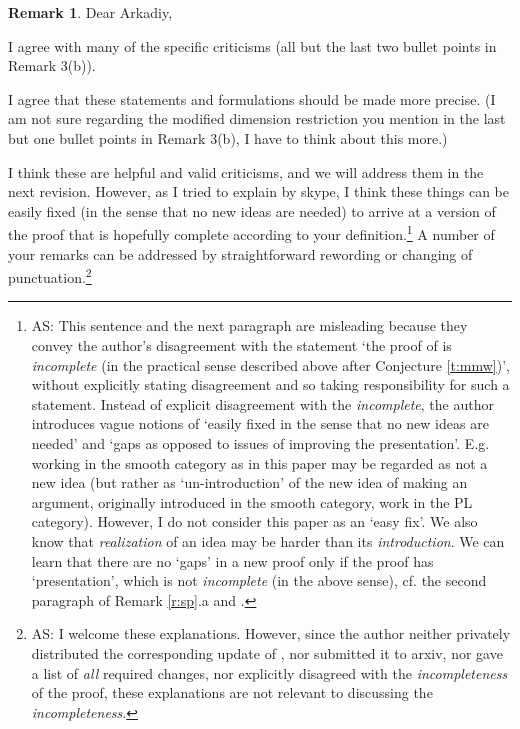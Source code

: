 \documentclass[12pt]{article}
\theoremstyle{plain}
\theoremstyle{definition}
\newtheorem{Remark}[Theorem]{Remark}
\begin{document}
{\begin{Remark}
Dear Arkadiy,

I agree with many of the specific criticisms (all but the last two bullet points in Remark 3(b)).

I agree that these statements and formulations should be made more precise.
(I am not sure regarding the modified dimension restriction you mention in the last
but one bullet points in Remark 3(b), I have to think about this more.)

I think these are helpful and valid criticisms, and we will address them in the next revision.
However, as I tried to explain by skype, I think these things can be easily fixed (in the sense that
no new ideas are needed)  to arrive at a version of the proof that is hopefully
complete according to your definition.\footnote{\label{f:unc} AS: This sentence and the next paragraph are misleading because they convey the author's disagreement with the statement `the proof of \cite{MW16} is {\it incomplete} (in the practical sense described above after Conjecture \ref{t:mmw})',  without explicitly stating disagreement  and so taking responsibility for such a statement.
Instead of explicit disagreement with the {\it incomplete}, the author introduces vague notions of `easily fixed in the sense that no new ideas are needed' and `gaps as opposed to issues of improving the presentation'.
\newline
E.g. working in the smooth category as in
this paper may be regarded as not a new idea (but rather as
`un-introduction' of the new idea of making an argument, originally introduced in the smooth category, work in the PL category).
However, I do not consider
this paper as an `easy fix'.
We also know that {\it realization} of an idea may be harder than its {\it introduction}.
We can learn that there are no `gaps' in a new proof only if the proof has `presentation', which is not
{\it incomplete} (in the above sense), cf. the second paragraph of Remark \ref{r:sp}.a and \cite[Remarks 2.3.abcd]{Sk21d}.}
A number of your remarks can be addressed by straightforward rewording or changing of punctuation.\footnote{\label{f:exp} AS: I welcome these explanations.
However, since the author neither privately distributed the corresponding update of \cite{MW16}, nor submitted it to arxiv, nor gave a list of {\it all} required changes, nor explicitly disagreed with the {\it incompleteness} of the proof, these explanations are not relevant to discussing the {\it incompleteness}.
}
\end{Remark}}
\end{document}
